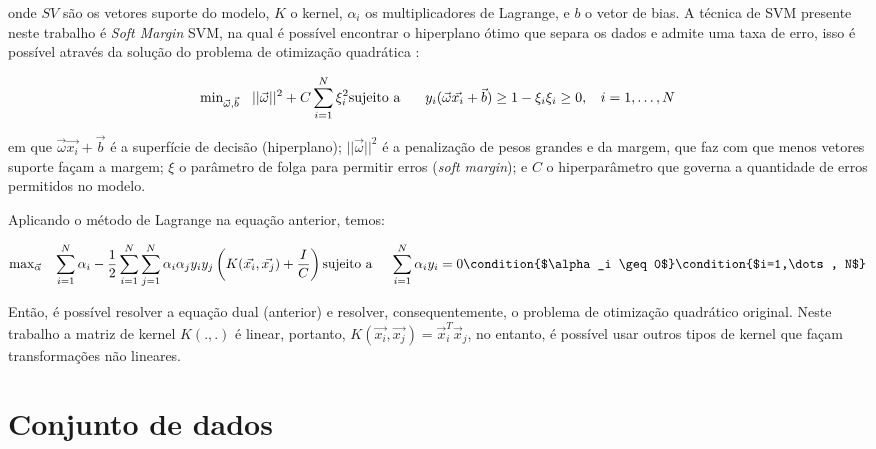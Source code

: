 \documentclass[12pt,a4paper,utf8]{ppgsi}
\begin{document}
onde $SV$ são os vetores suporte do modelo, $K$ o kernel, $\alpha_i$ os multiplicadores de Lagrange, e $b$ o vetor de bias. A técnica de SVM presente neste trabalho é \textit{Soft Margin} SVM, na qual é possível encontrar o hiperplano ótimo que separa os dados e admite uma taxa de erro, isso é possível através da solução do problema de otimização quadrática \citep{vapnik1999overview}:

\begin{dmath*} \label{eq:svmproblem}
   \textrm{min}_{\vec{\omega}, \vec{b}} \:\:\:\: ||\vec{\omega}||^2 + C \sum_{i=1}^{N} \xi_{i}^2 \\
    \textrm{sujeito a} \:\:\:\:\:\:\:\: y_i(\vec{\omega} \vec{x_i} + \vec{b}) \geq 1 - \xi_i \\
    \xi_i \geq 0, \:\:\:\: i = 1, \dots, N
\end{dmath*}

em que $\vec{\omega} \vec{x_i} + \vec{b}$ é a superfície de decisão (hiperplano); $||\vec{\omega}||^2$ é a penalização de pesos grandes e da margem, que faz com que menos vetores suporte façam a margem; $\xi$ o parâmetro de folga para permitir erros (\textit{soft margin}); e $C$ o hiperparâmetro que governa a quantidade de erros permitidos no modelo.

Aplicando o método de Lagrange na equação anterior, temos:

\begin{dmath*} \label{eq:svmla}
   \textrm{max}_{\vec{\alpha}} \:\:\:\: \sum_{i=1}^N \alpha_i - \frac{1}{2} \sum_{i=1}^{N} \sum_{j=1}^{N} \alpha_i \alpha_j y_i y_j \left( K(\vec{x_i}, \vec{x_j}) + \frac{I}{C} \right) \\
   \textrm{sujeito a} \:\:\:\:\:\: \sum_{i=1}^N \alpha_i y_i = 0 \condition{$\alpha_i \geq 0$} \condition{$i=1,\dots, N$}
\end{dmath*}

Então, é possível resolver a equação dual (anterior) e resolver, consequentemente, o problema de otimização quadrático original. Neste trabalho a matriz de kernel $K(.,.)$ é linear, portanto, $K(\vec{x_i}, \vec{x_j}) = \vec{x}_{i}^T \vec{x}_j$, no entanto, é possível usar outros tipos de kernel que façam transformações não lineares. 

\section{Conjunto de dados} \label{sec:conjdados}
\end{document}
